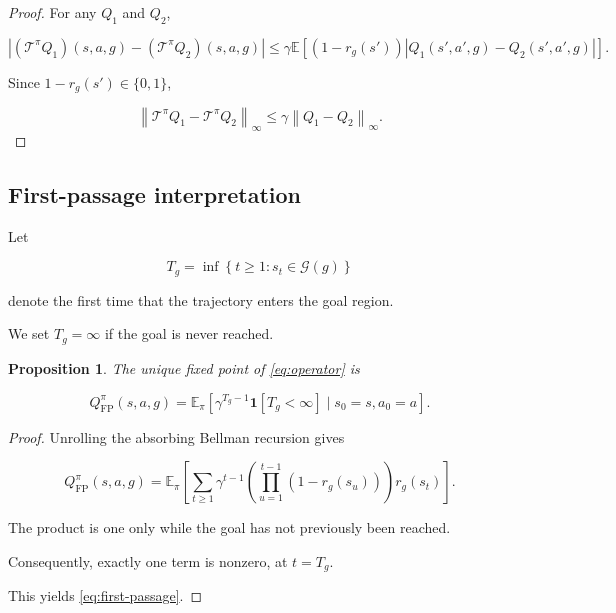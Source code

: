 \documentclass[11pt]{article}
\newcommand{\E}{\mathbb{E}}
\newcommand{\one}{\mathbf{1}}
\newcommand{\norm}[1]{\left\lVert #1 \right\rVert}
\newtheorem{proposition}{Proposition}
\theoremstyle{remark}
\begin{document}
\begin{proof}

For any $Q_1$ and $Q_2$,

\begin{equation}
\left|(\mathcal T^\pi Q_1)(s,a,g)-(\mathcal T^\pi Q_2)(s,a,g)\right|\leq\gamma\E\left[(1-r_g(s'))\left|Q_1(s',a',g)-Q_2(s',a',g)\right|\right].
\end{equation}

Since $1-r_g(s')\in\{0,1\}$,

\begin{equation}
\norm{\mathcal T^\pi Q_1-\mathcal T^\pi Q_2}_\infty\leq\gamma\norm{Q_1-Q_2}_\infty.
\end{equation}

\end{proof}

\subsection{First-passage interpretation}

Let

\begin{equation}
T_g=\inf\left\{t\geq 1:s_t\in\mathcal G(g)\right\}
\label{eq:hitting-time}
\end{equation}

denote the first time that the trajectory enters the goal region.

We set $T_g=\infty$ if the goal is never reached.

\begin{proposition}
The unique fixed point of \eqref{eq:operator} is

\begin{equation}
Q_{\mathrm{FP}}^\pi(s,a,g)=\E_\pi\left[\gamma^{T_g-1}\one[T_g<\infty]\mid s_0=s,a_0=a\right].
\label{eq:first-passage}
\end{equation}

\end{proposition}

\begin{proof}

Unrolling the absorbing Bellman recursion gives

\begin{equation}
Q_{\mathrm{FP}}^\pi(s,a,g)=\E_\pi\left[\sum_{t\geq 1}\gamma^{t-1}\left(\prod_{u=1}^{t-1}(1-r_g(s_u))\right)r_g(s_t)\right].
\end{equation}

The product is one only while the goal has not previously been reached.

Consequently, exactly one term is nonzero, at $t=T_g$.

This yields \eqref{eq:first-passage}.

\end{proof}
\end{document}
